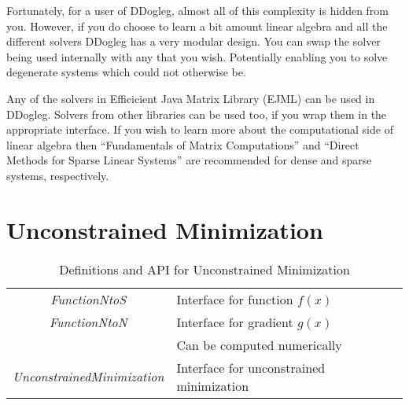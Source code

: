 \documentclass[peerreview,compsoc,onecolumn]{IEEEtran}
\begin{document}
Fortunately, for a user of DDogleg, almost all of this complexity is hidden from you. However, if you do choose to learn a bit amount linear algebra and all the different solvers DDogleg has a very modular design. You can swap the solver being used internally with any that you wish. Potentially enabling you to solve degenerate systems which could not otherwise be. 

Any of the solvers in Efficicient Java Matrix Library (EJML) \cite{ejml2018} can be used in DDogleg. Solvers from other libraries can be used too, if you wrap them in the appropriate interface. If you wish to learn more about the computational side of linear algebra then ``Fundamentals of Matrix Computations'' \cite{watkins2010} and ``Direct Methods for Sparse Linear Systems'' \cite{davis2006} are recommended for dense and sparse systems, respectively.

\section{Unconstrained Minimization}

\begin{table}[h]
\centering
\caption{\label{definitions:UM}Definitions and API for Unconstrained Minimization}
\begin{tabular}{cl}
\textit{FunctionNtoS} & Interface for function $f(x)$ \\
\textit{FunctionNtoN} & Interface for gradient $g(x)$ \\
& Can be computed numerically \\
\textit{UnconstrainedMinimization} & Interface for unconstrained minimization
\end{tabular}
\end{table}
\end{document}
